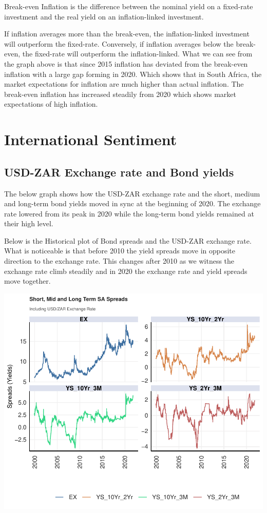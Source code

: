 \documentclass[11pt,preprint, authoryear]{elsarticle}
\numberwithin{equation}{section}
\numberwithin{figure}{section}
\numberwithin{table}{section}
\begin{document}
Break-even Inflation is the difference between the nominal yield on a
fixed-rate investment and the real yield on an inflation-linked
investment.

If inflation averages more than the break-even, the inflation-linked
investment will outperform the fixed-rate. Conversely, if inflation
averages below the break-even, the fixed-rate will outperform the
inflation-linked. What we can see from the graph above is that since
2015 inflation has deviated from the break-even inflation with a large
gap forming in 2020. Which shows that in South Africa, the market
expectations for inflation are much higher than actual inflation. The
break-even inflation has increased steadily from 2020 which shows market
expectations of high inflation.

\hypertarget{international-sentiment}{%
\section{International Sentiment}\label{international-sentiment}}

\hypertarget{usd-zar-exchange-rate-and-bond-yields}{%
\subsection{USD-ZAR Exchange rate and Bond
yields}\label{usd-zar-exchange-rate-and-bond-yields}}

The below graph shows how the USD-ZAR exchange rate and the short,
medium and long-term bond yields moved in sync at the beginning of 2020.
The exchange rate lowered from its peak in 2020 while the long-term bond
yields remained at their high level.

Below is the Historical plot of Bond spreads and the USD-ZAR exchange
rate. What is noticeable is that before 2010 the yield spreads move in
opposite direction to the exchange rate. This changes after 2010 as we
witness the exchange rate climb steadily and in 2020 the exchange rate
and yield spreads move together.

\includegraphics{Question2_files/figure-latex/unnamed-chunk-11-1.pdf}
\end{document}
